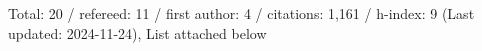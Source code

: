 Total: 20 / refereed: 11 / first author: 4 / citations: 1,161 / h-index: 9 (Last updated: 2024-11-24), List attached below
